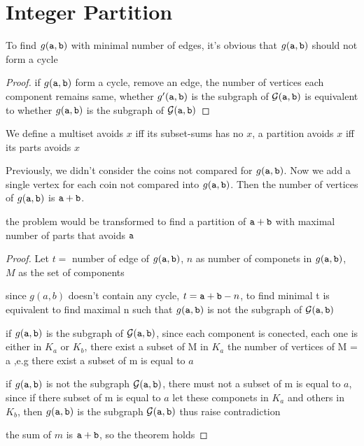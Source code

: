 \section{Integer Partition}

\noindent
To find $g(\mathtt{a},\mathtt{b})$ with minimal number of edges, it's obvious that $g(\mathtt{a} ,\mathtt{b})$ should not form a cycle

\begin{proof} 
if $g(\mathtt{a},\mathtt{b})$ form a cycle, remove an edge, the number of vertices each component remains same, whether $g'(\mathtt{a},\mathtt{b})$ is the subgraph of ${\cal G}(\mathtt{a},\mathtt{b})$ is equivalent to whether $g(\mathtt{a},\mathtt{b})$ is the subgraph of ${\cal G}(\mathtt{a},\mathtt{b})$
\end{proof}

\begin{definition}
We define a multiset avoids $x$ iff its subset-sums has no $x$, a partition avoids $x$ iff its parts avoids $x$
\end{definition}

Previously, we didn't consider the coins not compared for $g(\mathtt{a},\mathtt{b})$. Now we add a single vertex for each coin not compared into $g(\mathtt{a},\mathtt{b})$. Then the number of vertices of $g(\mathtt{a},\mathtt{b})$ is $\mathtt{a}+\mathtt{b}$.

\begin{theorem}

the problem would be transformed to find a partition of $\mathtt{a}+\mathtt{b}$ with  maximal number of parts that avoids $\mathtt{a}$

\end{theorem}

\begin{proof} 
Let $t =$ number of edge of $g(\mathtt{a},\mathtt{b})$, 
$n$ as number of componets in $g(\mathtt{a},\mathtt{b})$, 
$M$ as the set of components



since $g(a,b)$ doesn't contain any cycle, $t = \mathtt{a}+\mathtt{b} - n$, to find minimal t is equivalent to find maximal n such that $g(\mathtt{a},\mathtt{b})$ is not the subgraph of ${\cal G}(\mathtt{a},\mathtt{b})$

if $g(\mathtt{a},\mathtt{b})$ is the subgraph of ${\cal G}(\mathtt{a},\mathtt{b})$, 
since each component is conected, each one is either in $K_a$ or $K_b$, there exist a subset of M in $K_a$ the number of vertices of M = a
,e.g there exist a subset of m is equal to $a$

if $g(\mathtt{a},\mathtt{b})$ is not the subgraph ${\cal G}(\mathtt{a},\mathtt{b})$, there must not a subset of m is equal to $a$, since if there subset of m is equal to $a$ let these componets in $K_a$ and others in $K_b$, then $g(\mathtt{a},\mathtt{b})$ is the subgraph ${\cal G}(\mathtt{a},\mathtt{b})$ thus raise contradiction

the sum of $m$ is $\mathtt{a}+\mathtt{b}$, so the theorem holds

\end{proof}

